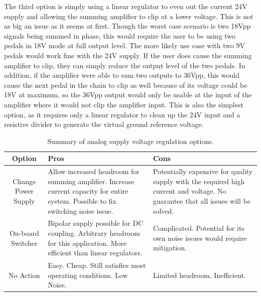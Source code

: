 \documentclass{article}
\begin{document}
	The third option is simply using a linear regulator to even out the current 24V supply and allowing the summing amplifier to clip at a lower voltage.  This is not as big an issue as it seems at first.  Though the worst case scenario is two 18Vpp signals being summed in phase, this would require the user to be using two pedals in 18V mode at full output level.  The more likely use case with two 9V pedals would work fine with the 24V supply.  If the user does cause the summing amplifier to clip, they can simply reduce the output level of the two pedals.  In addition, if the amplifier were able to sum two outputs to 36Vpp, this would cause the next pedal in the chain to clip as well because of its voltage could be 18V at maximum, so the 36Vpp output would only be usable at the input of the amplifier where it would not clip the amplifier input.  This is also the simplest option, as it requires only a linear regulator to clean up the 24V input and a resistive divider to generate the virtual ground reference voltage.  

	\begin{table}
	\begin{center}
	\begin{tabular}{|c|p{2.25in} p{2.25in}|}
	\hline
	Option & Pros & Cons \\
	\hline
	Change Power Supply 	& Allow increased headroom for summing amplifier.  Increase current capacity for entire system.  Possible to fix switching noise issue. 
								& Potentially expensive for quality supply with the required high current and voltage.  No guarantee that all issues will be solved. \\
	On-board Switcher 		& Bipolar supply possible for DC coupling.  Arbitrary headroom for this application.  More efficient than linear regulators. 	
								& Complicated.  Potential for its own noise issues would require mitigation. \\
	No Action 				& Easy.  Cheap.  Still satisfies most operating conditions. Low Noise.
								& Limited headroom.  Inefficient. \\
	\hline
	\end{tabular}
	\caption{Summary of analog supply voltage regulation options.}
	\label{tab:pwrsupplyproscons}
	\end{center}
	\end{table}
\end{document}
